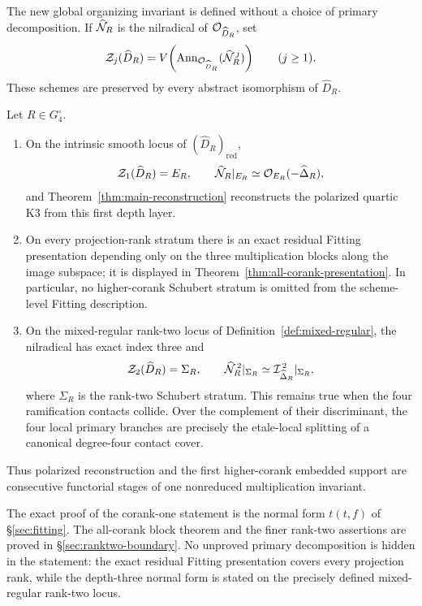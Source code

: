 The new global organizing invariant is defined without a choice of
primary decomposition.  If $\widehat{\mathcal N}_R$ is the nilradical of
$\mathcal O_{\widehat D_R}$, set
\[
 \mathcal Z_j(\widehat D_R)
   =V\!\left(\operatorname{Ann}_{\mathcal O_{\widehat D_R}}
                    (\widehat{\mathcal N}_R^{\,j})\right)
 \qquad(j\ge1).
\]
These schemes are preserved by every abstract isomorphism of
$\widehat D_R$.

\begin{theorem}
\label{thm:main-depth}
Let $R\in G_4^\circ$.
\begin{enumerate}
\item On the intrinsic smooth locus of
$(\widehat D_R)_{\mathrm{red}}$,
\[
 \mathcal Z_1(\widehat D_R)=E_R,
 \qquad
 \widehat{\mathcal N}_R|_{E_R}\simeq\mathcal O_{E_R}(-\widehat\Delta_R),
\]
and Theorem~\ref{thm:main-reconstruction} reconstructs the polarized
quartic K3 from this first depth layer.
\item On every projection-rank stratum there is an exact residual
Fitting presentation depending only on the three multiplication blocks
along the image subspace; it is displayed in
Theorem~\ref{thm:all-corank-presentation}.  In particular, no
higher-corank Schubert stratum is omitted from the scheme-level Fitting
description.
\item On the mixed-regular rank-two locus of
Definition~\ref{def:mixed-regular}, the nilradical has exact index
three and
\[
 \mathcal Z_2(\widehat D_R)=\Sigma_R,
 \qquad
 \widehat{\mathcal N}_R^{\,2}|_{\Sigma_R}
   \simeq\mathcal I_{\widehat\Delta_R}^{\,2}|_{\Sigma_R},
\]
where $\Sigma_R$ is the rank-two Schubert stratum.  This remains true
when the four ramification contacts collide.  Over the complement of
their discriminant, the four local primary branches are precisely the
etale-local splitting of a canonical degree-four contact cover.
\end{enumerate}
Thus polarized reconstruction and the first higher-corank embedded
support are consecutive functorial stages of one nonreduced
multiplication invariant.
\end{theorem}

The exact proof of the corank-one statement is the normal form
$t(t,f)$ of \S\ref{sec:fitting}.  The all-corank block theorem and
the finer rank-two assertions are proved in
\S\ref{sec:ranktwo-boundary}.  No unproved primary decomposition is
hidden in the statement: the exact residual Fitting presentation
covers every projection rank, while the depth-three normal form is
stated on the precisely defined mixed-regular rank-two locus.

